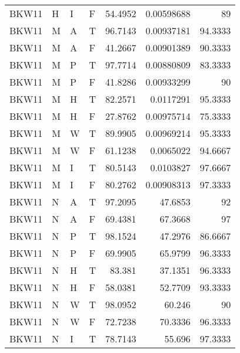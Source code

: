 \begin{longtable}{llllrrr}
    BKW11    & H         & I         & F          & 54.4952    & 0.00598688  & 89       \\
    BKW11    & M         & A         & T          & 96.7143    & 0.00937181  & 94.3333  \\
    BKW11    & M         & A         & F          & 41.2667    & 0.00901389  & 90.3333  \\
    BKW11    & M         & P         & T          & 97.7714    & 0.00880809  & 83.3333  \\
    BKW11    & M         & P         & F          & 41.8286    & 0.00933299  & 90       \\
    BKW11    & M         & H         & T          & 82.2571    & 0.0117291   & 95.3333  \\
    BKW11    & M         & H         & F          & 27.8762    & 0.00975714  & 75.3333  \\
    BKW11    & M         & W         & T          & 89.9905    & 0.00969214  & 95.3333  \\
    BKW11    & M         & W         & F          & 61.1238    & 0.0065022   & 94.6667  \\
    BKW11    & M         & I         & T          & 80.5143    & 0.0103827   & 97.6667  \\
    BKW11    & M         & I         & F          & 80.2762    & 0.00908313  & 97.3333  \\
    BKW11    & N         & A         & T          & 97.2095    & 47.6853     & 92       \\
    BKW11    & N         & A         & F          & 69.4381    & 67.3668     & 97       \\
    BKW11    & N         & P         & T          & 98.1524    & 47.2976     & 86.6667  \\
    BKW11    & N         & P         & F          & 69.9905    & 65.9799     & 96.3333  \\
    BKW11    & N         & H         & T          & 83.381     & 37.1351     & 96.3333  \\
    BKW11    & N         & H         & F          & 58.0381    & 52.7709     & 93.3333  \\
    BKW11    & N         & W         & T          & 98.0952    & 60.246      & 90       \\
    BKW11    & N         & W         & F          & 72.7238    & 70.3336     & 96.3333  \\
    BKW11    & N         & I         & T          & 78.7143    & 55.696      & 97.3333  \\

\end{longtable}
